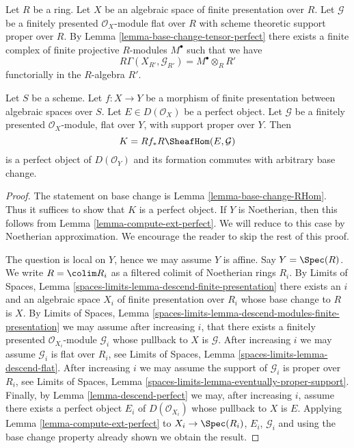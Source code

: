 \begin{remark}
\label{remark-explain-perfect-direct-image}
Let $R$ be a ring. Let $X$ be an algebraic space of finite presentation over
$R$. Let $\mathcal{G}$ be a finitely presented $\mathcal{O}_X$-module
flat over $R$ with scheme theoretic support proper over $R$. By
Lemma \ref{lemma-base-change-tensor-perfect}
there exists a finite complex of finite projective $R$-modules
$M^\bullet$ such that we have
$$
R\Gamma(X_{R'}, \mathcal{G}_{R'}) = M^\bullet \otimes_R R'
$$
functorially in the $R$-algebra $R'$.
\end{remark}

\begin{lemma}
\label{lemma-base-change-RHom-perfect}
Let $S$ be a scheme.
Let $f : X \to Y$ be a morphism of finite presentation
between algebraic spaces over $S$.
Let $E \in D(\mathcal{O}_X)$ be a perfect object. Let $\mathcal{G}$ be a
finitely presented $\mathcal{O}_X$-module, flat over $Y$, with support
proper over $Y$. Then
$$
K = Rf_*R\SheafHom(E, \mathcal{G})
$$
is a perfect object of $D(\mathcal{O}_Y)$ and its formation
commutes with arbitrary base change.
\end{lemma}

\begin{proof}
The statement on base change is Lemma \ref{lemma-base-change-RHom}.
Thus it suffices to show that $K$ is a perfect object. If $Y$ is
Noetherian, then this follows from
Lemma \ref{lemma-compute-ext-perfect}.
We will reduce to this case by Noetherian approximation.
We encourage the reader to skip the rest of this proof.

\medskip\noindent
The question is local on $Y$, hence we may assume $Y$ is affine.
Say $Y = \Spec(R)$. We write $R = \colim R_i$ as a filtered colimit
of Noetherian rings $R_i$. By Limits of Spaces, Lemma
\ref{spaces-limits-lemma-descend-finite-presentation}
there exists an $i$ and an algebraic space $X_i$ of finite presentation
over $R_i$ whose base change to $R$ is $X$. By
Limits of Spaces, Lemma
\ref{spaces-limits-lemma-descend-modules-finite-presentation}
we may assume after increasing $i$, that there exists a finitely
presented $\mathcal{O}_{X_i}$-module $\mathcal{G}_i$ whose
pullback to $X$ is $\mathcal{G}$. After increasing $i$
we may assume $\mathcal{G}_i$ is flat over $R_i$, see
Limits of Spaces, Lemma
\ref{spaces-limits-lemma-descend-flat}.
After increasing $i$ we may assume the support of $\mathcal{G}_i$
is proper over $R_i$, see
Limits of Spaces, Lemma \ref{spaces-limits-lemma-eventually-proper-support}.
Finally, by Lemma \ref{lemma-descend-perfect}
we may, after increasing $i$, assume there exists a perfect
object $E_i$ of $D(\mathcal{O}_{X_i})$ whose pullback to
$X$ is $E$. Applying Lemma \ref{lemma-compute-ext-perfect}
to $X_i \to \Spec(R_i)$, $E_i$, $\mathcal{G}_i$ and using the
base change property already shown we obtain the result.
\end{proof}















